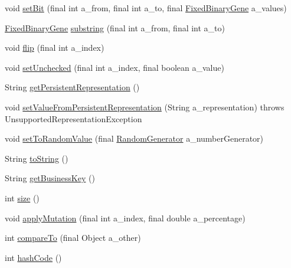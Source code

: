 \begin{DoxyCompactItemize}
\item 
void \hyperlink{classorg_1_1jgap_1_1impl_1_1_fixed_binary_gene_a4d04b8ab55987767b139f363016adc86}{set\-Bit} (final int a\-\_\-from, final int a\-\_\-to, final \hyperlink{classorg_1_1jgap_1_1impl_1_1_fixed_binary_gene}{Fixed\-Binary\-Gene} a\-\_\-values)
\item 
\hyperlink{classorg_1_1jgap_1_1impl_1_1_fixed_binary_gene}{Fixed\-Binary\-Gene} \hyperlink{classorg_1_1jgap_1_1impl_1_1_fixed_binary_gene_aea3c1ac18b8d5f5973d19f3341391fc4}{substring} (final int a\-\_\-from, final int a\-\_\-to)
\item 
void \hyperlink{classorg_1_1jgap_1_1impl_1_1_fixed_binary_gene_ad7598834041ed4d44e314e7ba14b6408}{flip} (final int a\-\_\-index)
\item 
void \hyperlink{classorg_1_1jgap_1_1impl_1_1_fixed_binary_gene_a195ad657263776ccbff547e6d720efb5}{set\-Unchecked} (final int a\-\_\-index, final boolean a\-\_\-value)
\item 
String \hyperlink{classorg_1_1jgap_1_1impl_1_1_fixed_binary_gene_a9c557fe781b49efc9afb7c4b5f00ad38}{get\-Persistent\-Representation} ()
\item 
void \hyperlink{classorg_1_1jgap_1_1impl_1_1_fixed_binary_gene_a1b079182739f988716e7bcb26664a77f}{set\-Value\-From\-Persistent\-Representation} (String a\-\_\-representation)  throws Unsupported\-Representation\-Exception 
\item 
void \hyperlink{classorg_1_1jgap_1_1impl_1_1_fixed_binary_gene_aa827e651eccd75a92b29e72563ebb29d}{set\-To\-Random\-Value} (final \hyperlink{interfaceorg_1_1jgap_1_1_random_generator}{Random\-Generator} a\-\_\-number\-Generator)
\item 
String \hyperlink{classorg_1_1jgap_1_1impl_1_1_fixed_binary_gene_a50ac7f407c3570cecf66f7b423d98187}{to\-String} ()
\item 
String \hyperlink{classorg_1_1jgap_1_1impl_1_1_fixed_binary_gene_a028399260d741704b157bfdd0d411a3a}{get\-Business\-Key} ()
\item 
int \hyperlink{classorg_1_1jgap_1_1impl_1_1_fixed_binary_gene_a1f65b004a1004c6e5acf7ad64628a72e}{size} ()
\item 
void \hyperlink{classorg_1_1jgap_1_1impl_1_1_fixed_binary_gene_a49cc6b322997c5a5507956b714d5d735}{apply\-Mutation} (final int a\-\_\-index, final double a\-\_\-percentage)
\item 
int \hyperlink{classorg_1_1jgap_1_1impl_1_1_fixed_binary_gene_a35ddbee61a1634d7f92b12304672f10b}{compare\-To} (final Object a\-\_\-other)
\item 
int \hyperlink{classorg_1_1jgap_1_1impl_1_1_fixed_binary_gene_ad7d37f0b41a92f1a945befe54e25b52a}{hash\-Code} ()
\end{DoxyCompactItemize}
